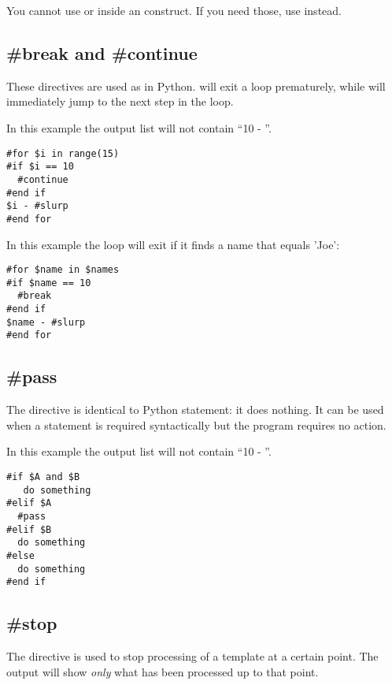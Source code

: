 You cannot use  or  inside an 
construct.  If you need those, use  instead.

\subsection{\#break and \#continue}
\label{flowControl.break}

These directives are used as in Python.  will
exit a  loop prematurely, while  will immediately
jump to the next step in the  loop.

In this example the output list will not contain ``10 - ''. 
\begin{verbatim}
#for $i in range(15)
#if $i == 10
  #continue
#end if
$i - #slurp
#end for
\end{verbatim}

In this example the loop will exit if it finds a name that equals 'Joe':
\begin{verbatim}
#for $name in $names
#if $name == 10
  #break
#end if
$name - #slurp
#end for
\end{verbatim}


\subsection{\#pass}
\label{flowControl.pass}

The  directive is identical to Python  statement: it
does nothing. It can be used when a statement is required syntactically but the
program requires no action.

In this example the output list will not contain ``10 - ''. 
\begin{verbatim}
#if $A and $B
   do something
#elif $A
  #pass
#elif $B
  do something
#else
  do something
#end if
\end{verbatim}


\subsection{\#stop}
\label{flowControl.stop}

The  directive is used to stop processing of a template at a
certain point.  The output will show {\em only} what has been processed up to
that point.  

